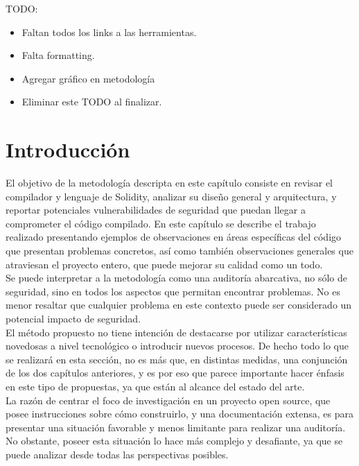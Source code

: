 TODO:
\begin{itemize}
    \item Faltan todos los links a las herramientas.
    \item Falta formatting.
    \item Agregar gráfico en metodología
    \item Eliminar este TODO al finalizar.
\end{itemize}
\bigskip

\section{Introducción}

El objetivo de la metodología descripta en este capítulo consiste en revisar el compilador y lenguaje de Solidity, analizar su diseño general y arquitectura, y reportar potenciales vulnerabilidades de seguridad que puedan llegar a comprometer el código compilado. En este capítulo se describe el trabajo realizado presentando ejemplos de observaciones en áreas específicas del código que presentan problemas concretos, así como también observaciones generales que atraviesan el proyecto entero, que puede mejorar su calidad como un todo.\\

Se puede interpretar a la metodología como una auditoría abarcativa, no sólo de seguridad, sino en todos los aspectos que permitan encontrar problemas. No es menor resaltar que cualquier problema en este contexto puede ser considerado un potencial impacto de seguridad.\\

El método propuesto no tiene intención de destacarse por utilizar características novedosas a nivel tecnológico o introducir nuevos procesos. De hecho todo lo que se realizará en esta sección, no es más que, en distintas medidas, una conjunción de los dos capítulos anteriores, y es por eso que parece importante hacer énfasis en este tipo de propuestas, ya que están al alcance del estado del arte.\\

La razón de centrar el foco de investigación en un proyecto open source, que posee instrucciones sobre cómo construirlo, y una documentación extensa, es para presentar una situación favorable y menos limitante para realizar una auditoría. No obstante, poseer esta situación lo hace más complejo y desafiante, ya que se puede analizar desde todas las perspectivas posibles.\\

